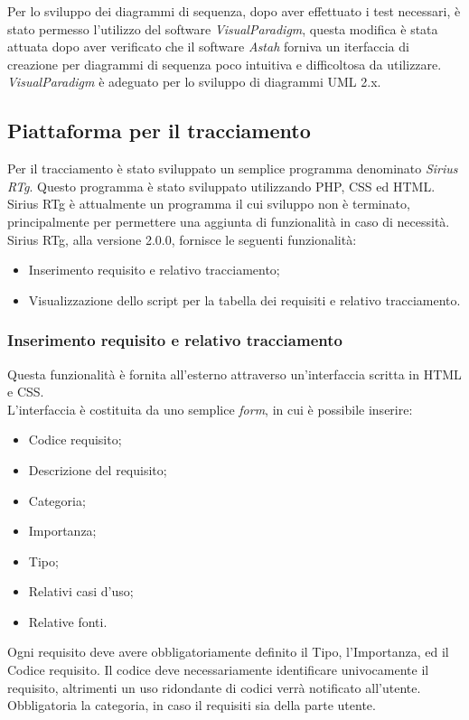 Per lo sviluppo dei diagrammi di sequenza, dopo aver effettuato i test necessari, è stato permesso l'utilizzo del software \textit{VisualParadigm}, questa modifica è stata attuata dopo aver verificato che il software \textit{Astah} forniva un iterfaccia di creazione per diagrammi di sequenza poco intuitiva e difficoltosa da utilizzare. \textit{VisualParadigm} è adeguato per lo sviluppo di diagrammi UML 2.x.

\subsection{Piattaforma per il tracciamento}
Per il tracciamento è stato sviluppato un semplice programma denominato \textit{Sirius RTg}. Questo programma è stato sviluppato utilizzando PHP, CSS ed HTML. Sirius RTg è attualmente un programma il cui sviluppo non è terminato, principalmente per permettere una aggiunta di funzionalità in caso di necessità. Sirius RTg, alla versione 2.0.0, fornisce le seguenti funzionalità:
\begin{itemize}
\item Inserimento requisito e relativo tracciamento;
\item Visualizzazione dello script per la tabella dei requisiti e relativo tracciamento.
\end{itemize}
\subsubsection{Inserimento requisito e relativo tracciamento}
Questa funzionalità è fornita all'esterno attraverso un'interfaccia scritta in HTML e CSS.\\
L'interfaccia è costituita da uno semplice \textit{form}, in cui è possibile inserire:
\begin{itemize}
\item Codice requisito;
\item Descrizione del requisito;
\item Categoria;
\item Importanza;
\item Tipo;
\item Relativi casi d'uso;
\item Relative fonti.
\end{itemize}
Ogni requisito deve avere obbligatoriamente definito il Tipo, l'Importanza, ed il Codice requisito. Il codice deve necessariamente identificare univocamente il requisito, altrimenti un uso ridondante di codici verrà notificato all'utente. Obbligatoria la categoria, in caso il requisiti sia della parte utente.
